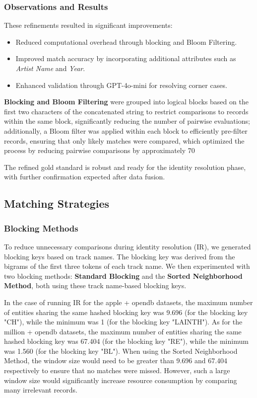 \documentclass[runningheads]{llncs}
\begin{document}
\subsubsection*{Observations and Results}
These refinements resulted in significant improvements:
\begin{itemize}
    \item Reduced computational overhead through blocking and Bloom Filtering.
    \item Improved match accuracy by incorporating additional attributes such as \textit{Artist Name} and \textit{Year}.
    \item Enhanced validation through GPT-4o-mini for resolving corner cases.
\end{itemize}
\textbf{Blocking and Bloom Filtering} were grouped into logical blocks based on the first two characters of the concatenated string to restrict comparisons to records within the same block, significantly reducing the number of pairwise evaluations; additionally, a Bloom filter was applied within each block to efficiently pre-filter records, ensuring that only likely matches were compared, which optimized the process by reducing pairwise comparisons by approximately 70%

The refined gold standard is robust and ready for the identity resolution phase, with further confirmation expected after data fusion.

\subsection{Matching Strategies}
\subsubsection{Blocking Methods}

To reduce unnecessary comparisons during identity resolution (IR), we generated blocking keys based on track names. The blocking key was derived from the bigrams of the first three tokens of each track name. We then experimented with two blocking methods: \textbf{Standard Blocking} and the \textbf{Sorted Neighborhood Method}, both using these track name-based blocking keys.

In the case of running IR for the apple + opendb datasets, the maximum number of entities sharing the same hashed blocking key was 9.696 (for the blocking key "CH"), while the minimum was 1 (for the blocking key "LAINTH"). As for the million + opendb datasets, the maximum number of entities sharing the same hashed blocking key was 67.404 (for the blocking key "RE"), while the minimum was 1.560 (for the blocking key "BL"). When using the Sorted Neighborhood Method, the window size would need to be greater than 9.696 and 67.404 respectively to ensure that no matches were missed. However, such a large window size would significantly increase resource consumption by comparing many irrelevant records.
\end{document}
